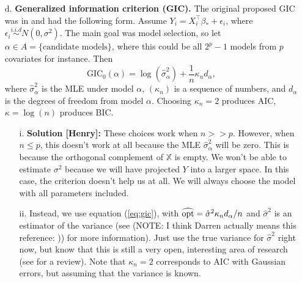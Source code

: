 \documentclass[11pt]{article}
\begin{document}
\begin{enumerate}
\begin{itemize}
  \item[d.]  \textbf{Generalized information criterion (GIC).}  The original
    proposed GIC was in \cite{nishii1984asymptotic} and had the following form.
    Assume $Y_i = X_i^{\top} \beta_* + \epsilon_i$, where $\epsilon_i
    \stackrel{i.i.d}{\sim} N(0,\sigma^2)$.  The main goal was model selection,
    so let $\alpha \in A = \{ \textrm{candidate models} \}$, where this could be
    all $2^p - 1$ models from $p$ covariates for instance.  Then
    \[
    \textrm{GIC}_0(\alpha) = \log(\hat\sigma_{\alpha}^2) + \frac{1}{n} \kappa_n
    d_{\alpha},
    \]
    where $\hat\sigma_{\alpha}^2$ is the MLE under model $\alpha$, $(\kappa_n)$
    is a sequence of numbers, and $d_{\alpha}$ is the degrees of freedom from
    model $\alpha$.  Choosing $\kappa_n = 2$ produces AIC, $\kappa = \log(n)$
    produces BIC.
    \begin{itemize}
    \item[i.]  \textbf{Solution [Henry]:} These choices work when $n >> p$. However,
      when $n \leq p$, this doesn't work at all because the MLE
      $\hat\sigma_{\alpha}^2$ will be zero. This is because the orthogonal
      complement of $\mathbb{X}$ is empty. We won't be able to estimate
      $\sigma^2$ because we will have projected $Y$ into a larger space. In this
      case, the criterion doesn't help us at all. We will always choose the
      model with all parameters included.
    \item[ii.] Instead, we use equation (\ref{eq:gic}), with $\widehat{\textrm{opt}} =
      \hat\sigma^2 \kappa_n d_{\alpha}/n$ and $\hat\sigma^2$ is an estimator of
      the variance (see \cite{zhang2010regularization} (NOTE: I think Darren
      actually means this reference: \cite{reid2013study})) for more
      information).  Just use the true variance for $\hat\sigma^2$ right now,
      but know that this is still a very open, interesting area of research (see
      \cite{reid2013study} for a review).  Note that $\kappa_n = 2$ corresponds
      to AIC with Gaussian errors, but assuming that the variance is known.


\end{itemize}
\end{itemize}
\end{enumerate}
\end{document}
